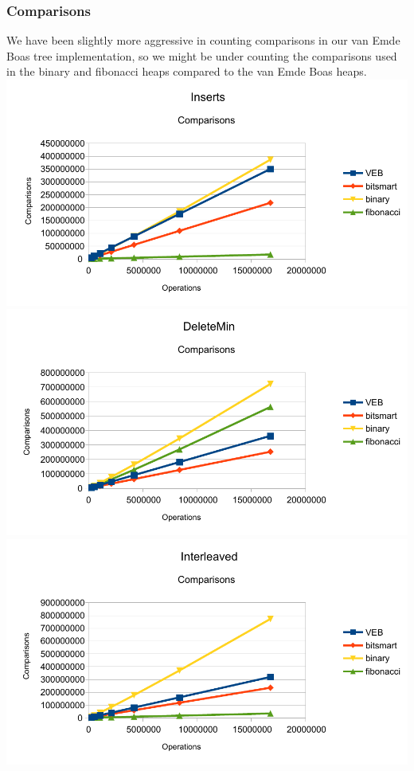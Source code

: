 \subsubsection{Comparisons}
We have been slightly more aggressive in counting comparisons in our van Emde Boas tree implementation, so we might be under counting the comparisons used in the binary and fibonacci heaps compared to the van Emde Boas heaps.
\includegraphics[width=\textwidth]{graphs/Inserts_comparisons.pdf}
\includegraphics[width=\textwidth]{graphs/DeleteMin_comparisons.pdf}
\includegraphics[width=\textwidth]{graphs/Interleaved_comparisons.pdf}

